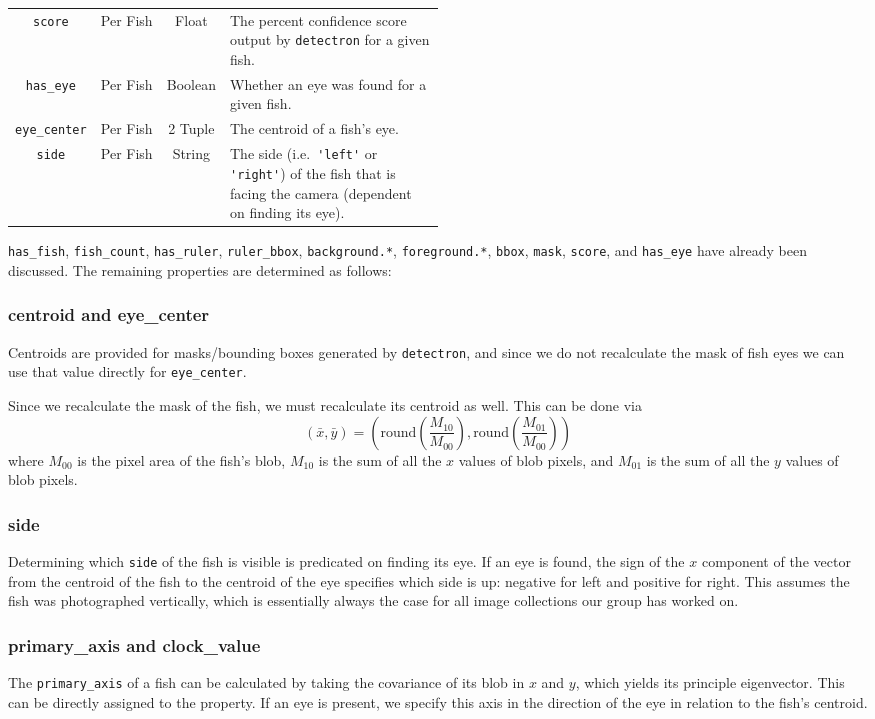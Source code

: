 \documentclass[screen,review]{acmart}
\begin{document}
\begin{table}[H]
\begin{tabular}{cccp{0.5\linewidth}}
        \verb|score| & Per Fish & Float & The percent confidence score output by \verb|detectron| for a given fish.\\
        \verb|has_eye| & Per Fish & Boolean & Whether an eye was found for a given fish.\\
        \verb|eye_center| & Per Fish & 2 Tuple & The centroid of a fish's eye.\\
        \verb|side| & Per Fish & String & The side (i.e.\ \verb|'left'| or \verb|'right'|) of the fish that is facing the camera (dependent on finding its eye).\\
      \bottomrule
\end{tabular}
\end{table}

\verb|has_fish|, \verb|fish_count|, \verb|has_ruler|, \verb|ruler_bbox|, \verb|background.*|, \verb|foreground.*|, \verb|bbox|, \verb|mask|, \verb|score|, and \verb|has_eye| have already been discussed. The remaining properties are determined as follows:
\subsubsection{centroid and eye\_center}
Centroids are provided for masks/bounding boxes generated by \verb|detectron|, and since we do not recalculate the mask of fish eyes we can use that value directly for \verb|eye_center|.

Since we recalculate the mask of the fish, we must recalculate its centroid as well. This can be done via
\begin{equation}
    (\bar{x}, \bar{y}) = (\mathrm{round}(\frac{M_{10}}{M_{00}}), \mathrm{round}(\frac{M_{01}}{M_{00}}))
\end{equation}
where \(M_{00}\) is the pixel area of the fish's blob, \(M_{10}\) is the sum of all the \(x\) values of blob pixels, and \(M_{01}\) is the sum of all the \(y\) values of blob pixels.
\subsubsection{side}
Determining which \verb|side| of the fish is visible is predicated on finding its eye. If an eye is found, the sign of the \(x\) component of the vector from the centroid of the fish to the centroid of the eye specifies which side is up: negative for left and positive for right. This assumes the fish was photographed vertically, which is essentially always the case for all image collections our group has worked on.
\subsubsection{primary\_axis and clock\_value}
The \verb|primary_axis| of a fish can be calculated by taking the covariance of its blob in \(x\) and \(y\), which yields its principle eigenvector. This can be directly assigned to the property. If an eye is present, we specify this axis in the direction of the eye in relation to the fish's centroid.
\end{document}

